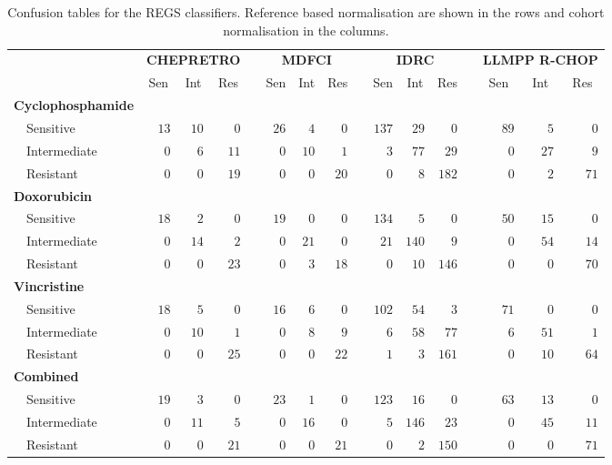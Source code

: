 \begin{table}[!tbp]
{\small
\caption{Confusion tables for the REGS classifiers.
Reference based normalisation are shown in the rows and cohort normalisation in
the columns.\label{tab:confusiondrugreference}} 
\begin{center}
\begin{tabular}{lrrrcrrrcrrrcrrr}
\hline\hline
\multicolumn{1}{l}{\bfseries }&\multicolumn{3}{c}{\bfseries CHEPRETRO}&\multicolumn{1}{c}{\bfseries }&\multicolumn{3}{c}{\bfseries MDFCI}&\multicolumn{1}{c}{\bfseries }&\multicolumn{3}{c}{\bfseries IDRC}&\multicolumn{1}{c}{\bfseries }&\multicolumn{3}{c}{\bfseries LLMPP R-CHOP}\tabularnewline
\cline{2-4} \cline{6-8} \cline{10-12} \cline{14-16}
\multicolumn{1}{l}{}&\multicolumn{1}{c}{Sen}&\multicolumn{1}{c}{Int}&\multicolumn{1}{c}{Res}&\multicolumn{1}{c}{}&\multicolumn{1}{c}{Sen}&\multicolumn{1}{c}{Int}&\multicolumn{1}{c}{Res}&\multicolumn{1}{c}{}&\multicolumn{1}{c}{Sen}&\multicolumn{1}{c}{Int}&\multicolumn{1}{c}{Res}&\multicolumn{1}{c}{}&\multicolumn{1}{c}{Sen}&\multicolumn{1}{c}{Int}&\multicolumn{1}{c}{Res}\tabularnewline
\hline
{\bfseries Cyclophosphamide}&&&&&&&&&&&&&&&\tabularnewline
~~Sensitive&$13$&$10$&$ 0$&&$26$&$ 4$&$ 0$&&$137$&$ 29$&$  0$&&$89$&$ 5$&$ 0$\tabularnewline
~~Intermediate&$ 0$&$ 6$&$11$&&$ 0$&$10$&$ 1$&&$  3$&$ 77$&$ 29$&&$ 0$&$27$&$ 9$\tabularnewline
~~Resistant&$ 0$&$ 0$&$19$&&$ 0$&$ 0$&$20$&&$  0$&$  8$&$182$&&$ 0$&$ 2$&$71$\tabularnewline
\hline
{\bfseries Doxorubicin}&&&&&&&&&&&&&&&\tabularnewline
~~Sensitive&$18$&$ 2$&$ 0$&&$19$&$ 0$&$ 0$&&$134$&$  5$&$  0$&&$50$&$15$&$ 0$\tabularnewline
~~Intermediate&$ 0$&$14$&$ 2$&&$ 0$&$21$&$ 0$&&$ 21$&$140$&$  9$&&$ 0$&$54$&$14$\tabularnewline
~~Resistant&$ 0$&$ 0$&$23$&&$ 0$&$ 3$&$18$&&$  0$&$ 10$&$146$&&$ 0$&$ 0$&$70$\tabularnewline
\hline
{\bfseries Vincristine}&&&&&&&&&&&&&&&\tabularnewline
~~Sensitive&$18$&$ 5$&$ 0$&&$16$&$ 6$&$ 0$&&$102$&$ 54$&$  3$&&$71$&$ 0$&$ 0$\tabularnewline
~~Intermediate&$ 0$&$10$&$ 1$&&$ 0$&$ 8$&$ 9$&&$  6$&$ 58$&$ 77$&&$ 6$&$51$&$ 1$\tabularnewline
~~Resistant&$ 0$&$ 0$&$25$&&$ 0$&$ 0$&$22$&&$  1$&$  3$&$161$&&$ 0$&$10$&$64$\tabularnewline
\hline
{\bfseries Combined}&&&&&&&&&&&&&&&\tabularnewline
~~Sensitive&$19$&$ 3$&$ 0$&&$23$&$ 1$&$ 0$&&$123$&$ 16$&$  0$&&$63$&$13$&$ 0$\tabularnewline
~~Intermediate&$ 0$&$11$&$ 5$&&$ 0$&$16$&$ 0$&&$  5$&$146$&$ 23$&&$ 0$&$45$&$11$\tabularnewline
~~Resistant&$ 0$&$ 0$&$21$&&$ 0$&$ 0$&$21$&&$  0$&$  2$&$150$&&$ 0$&$ 0$&$71$\tabularnewline
\hline
\end{tabular}\end{center}}

\end{table}
